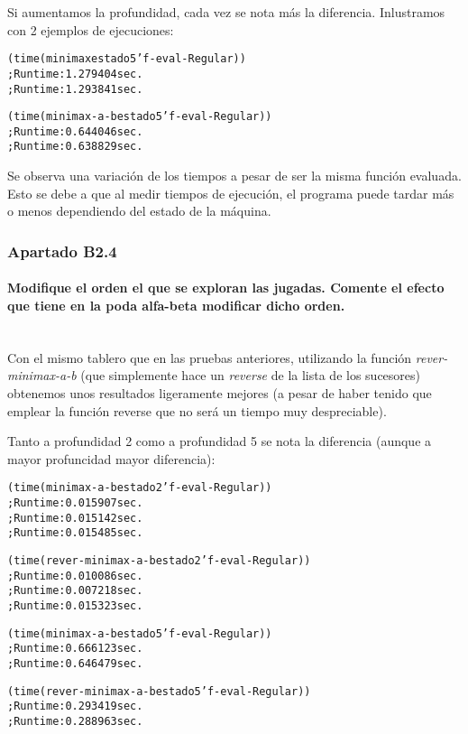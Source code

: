 \documentclass[nochap]{apuntes}
\begin{document}
Si aumentamos la profundidad, cada vez se nota más la diferencia. Inlustramos con 2 ejemplos de ejecuciones:

\begin{alltt}
(time (minimax estado 5 'f-eval-Regular)) 
  ; Run time: 1.279404 sec.
  ; Run time: 1.293841 sec.

(time (minimax-a-b estado 5 'f-eval-Regular)) 
  ; Run time: 0.644046 sec.
  ; Run time: 0.638829 sec.

\end{alltt}

Se observa una variación de los tiempos a pesar de ser la misma función evaluada. Esto se debe a que al medir tiempos de ejecución, el programa puede tardar más o menos dependiendo del estado de la máquina.

\subsubsection*{Apartado B2.4}
\paragraph{ Modifique el orden el que se exploran las jugadas. Comente el efecto que tiene en la poda alfa-beta modificar dicho orden.\\\\}

Con el mismo tablero que en las pruebas anteriores, utilizando la función \textit{rever-minimax-a-b} (que simplemente hace un \textit{reverse} de la lista de los sucesores) obtenemos unos resultados ligeramente mejores (a pesar de haber tenido que emplear la función reverse que no será un tiempo muy despreciable).

Tanto a profundidad 2 como a profundidad 5 se nota la diferencia (aunque a mayor profuncidad mayor diferencia):

\begin{alltt}
(time (minimax-a-b estado 2 'f-eval-Regular)) 
  ; Run time: 0.015907 sec.
  ; Run time: 0.015142 sec.
  ; Run time: 0.015485 sec.

(time (rever-minimax-a-b estado 2 'f-eval-Regular)) 
  ; Run time: 0.010086 sec.
  ; Run time: 0.007218 sec.
  ; Run time: 0.015323 sec.

(time (minimax-a-b estado 5 'f-eval-Regular)) 
  ; Run time: 0.666123 sec.
  ; Run time: 0.646479 sec.

(time (rever-minimax-a-b estado 5 'f-eval-Regular)) 
  ; Run time: 0.293419 sec.
  ; Run time: 0.288963 sec.
\end{alltt}
\end{document}
